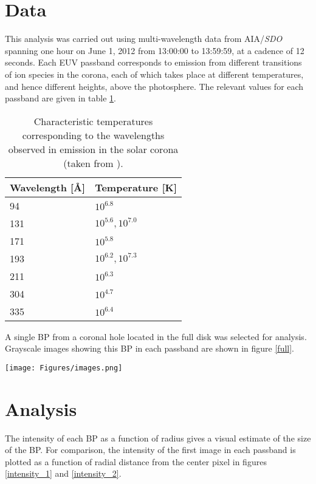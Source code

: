 \documentclass[preprint2]{aastex}
\begin{document}
\section{Data}\label{data}
This analysis was carried out using multi-wavelength data from AIA/\textit{SDO}
spanning one hour on June 1, 2012 from 13:00:00 to 13:59:59, at a cadence of 12
seconds.
Each EUV passband corresponds to emission
from different transitions of ion species in the corona, each of which takes
place at different temperatures, and hence different heights, above the
photosphere.
The relevant values for each passband are given in table \ref{temps}.
\begin{table}[h]
\centering
    \begin{tabular}{l l}
        \hline\hline
        Wavelength [\AA{}] & Temperature [K] \\
        \hline
        94 & $10^{6.8}$ \\
        131 & $10^{5.6}, 10^{7.0}$ \\
        171 & $10^{5.8}$ \\
        193 & $10^{6.2}, 10^{7.3}$ \\
        211 & $10^{6.3}$ \\
        304 & $10^{4.7}$ \\
        335 & $10^{6.4}$ \\
    \end{tabular}
\caption{Characteristic temperatures corresponding to the wavelengths observed
    in emission in the solar corona (taken from \cite{Lemen}).}
\label{temps}
\end{table}

A single BP from a coronal hole located in the full disk was selected for analysis.
Grayscale images showing this BP in each passband are shown in figure \ref{full}.

\begin{figure*}[htb!]
    \texttt{[image: Figures/images.png]}
    \caption{Images of the BP in six different AIA wavelengths.}
    \label{full}
\end{figure*}

\section{Analysis}\label{analysis}
The intensity of each BP as a function of radius gives a visual estimate
of the size of the BP. For comparison, the intensity of the first image in each
passband is plotted as a function of radial distance from the center pixel in figures
\ref{intensity_1} and \ref{intensity_2}.
\end{document}
